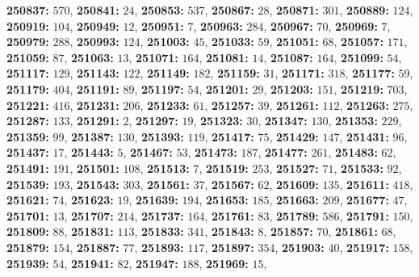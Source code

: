 \textsf{\bfseries 250837:} $570$, \textsf{\bfseries 250841:} $24$, \textsf{\bfseries 250853:} $537$, \textsf{\bfseries 250867:} $28$, \textsf{\bfseries 250871:} $301$, \textsf{\bfseries 250889:} $124$, \textsf{\bfseries 250919:} $104$, \textsf{\bfseries 250949:} $12$, \textsf{\bfseries 250951:} $7$, \textsf{\bfseries 250963:} $284$, \textsf{\bfseries 250967:} $70$, \textsf{\bfseries 250969:} $7$, \textsf{\bfseries 250979:} $288$, \textsf{\bfseries 250993:} $124$, \textsf{\bfseries 251003:} $45$, \textsf{\bfseries 251033:} $59$, \textsf{\bfseries 251051:} $68$, \textsf{\bfseries 251057:} $171$, \textsf{\bfseries 251059:} $87$, \textsf{\bfseries 251063:} $13$, \textsf{\bfseries 251071:} $164$, \textsf{\bfseries 251081:} $14$, \textsf{\bfseries 251087:} $164$, \textsf{\bfseries 251099:} $54$, \textsf{\bfseries 251117:} $129$, \textsf{\bfseries 251143:} $122$, \textsf{\bfseries 251149:} $182$, \textsf{\bfseries 251159:} $31$, \textsf{\bfseries 251171:} $318$, \textsf{\bfseries 251177:} $59$, \textsf{\bfseries 251179:} $404$, \textsf{\bfseries 251191:} $89$, \textsf{\bfseries 251197:} $54$, \textsf{\bfseries 251201:} $29$, \textsf{\bfseries 251203:} $151$, \textsf{\bfseries 251219:} $703$, \textsf{\bfseries 251221:} $416$, \textsf{\bfseries 251231:} $206$, \textsf{\bfseries 251233:} $61$, \textsf{\bfseries 251257:} $39$, \textsf{\bfseries 251261:} $112$, \textsf{\bfseries 251263:} $275$, \textsf{\bfseries 251287:} $133$, \textsf{\bfseries 251291:} $2$, \textsf{\bfseries 251297:} $19$, \textsf{\bfseries 251323:} $30$, \textsf{\bfseries 251347:} $130$, \textsf{\bfseries 251353:} $229$, \textsf{\bfseries 251359:} $99$, \textsf{\bfseries 251387:} $130$, \textsf{\bfseries 251393:} $119$, \textsf{\bfseries 251417:} $75$, \textsf{\bfseries 251429:} $147$, \textsf{\bfseries 251431:} $96$, \textsf{\bfseries 251437:} $17$, \textsf{\bfseries 251443:} $5$, \textsf{\bfseries 251467:} $53$, \textsf{\bfseries 251473:} $187$, \textsf{\bfseries 251477:} $261$, \textsf{\bfseries 251483:} $62$, \textsf{\bfseries 251491:} $191$, \textsf{\bfseries 251501:} $108$, \textsf{\bfseries 251513:} $7$, \textsf{\bfseries 251519:} $253$, \textsf{\bfseries 251527:} $71$, \textsf{\bfseries 251533:} $92$, \textsf{\bfseries 251539:} $193$, \textsf{\bfseries 251543:} $303$, \textsf{\bfseries 251561:} $37$, \textsf{\bfseries 251567:} $62$, \textsf{\bfseries 251609:} $135$, \textsf{\bfseries 251611:} $418$, \textsf{\bfseries 251621:} $74$, \textsf{\bfseries 251623:} $19$, \textsf{\bfseries 251639:} $194$, \textsf{\bfseries 251653:} $185$, \textsf{\bfseries 251663:} $209$, \textsf{\bfseries 251677:} $47$, \textsf{\bfseries 251701:} $13$, \textsf{\bfseries 251707:} $214$, \textsf{\bfseries 251737:} $164$, \textsf{\bfseries 251761:} $83$, \textsf{\bfseries 251789:} $586$, \textsf{\bfseries 251791:} $150$, \textsf{\bfseries 251809:} $88$, \textsf{\bfseries 251831:} $113$, \textsf{\bfseries 251833:} $341$, \textsf{\bfseries 251843:} $8$, \textsf{\bfseries 251857:} $70$, \textsf{\bfseries 251861:} $68$, \textsf{\bfseries 251879:} $154$, \textsf{\bfseries 251887:} $77$, \textsf{\bfseries 251893:} $117$, \textsf{\bfseries 251897:} $354$, \textsf{\bfseries 251903:} $40$, \textsf{\bfseries 251917:} $158$, \textsf{\bfseries 251939:} $54$, \textsf{\bfseries 251941:} $82$, \textsf{\bfseries 251947:} $188$, \textsf{\bfseries 251969:} $15$, 
